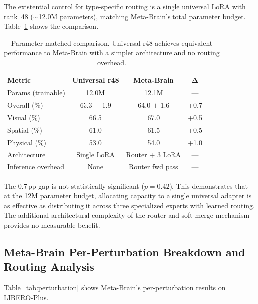 \documentclass[letterpaper]{article}
\newcommand{\ours}{Meta-Brain}
\newcommand{\pp}{\,\text{pp}}
\begin{document}
The existential control for type-specific routing is a single universal LoRA with rank~48 ($\sim$12.0M parameters), matching \ours{}'s total parameter budget. Table~\ref{tab:r48} shows the comparison.

\begin{table}[h]
\centering
\caption{Parameter-matched comparison. Universal r48 achieves equivalent performance to \ours{} with a simpler architecture and no routing overhead.}
\label{tab:r48}
\small
\begin{tabular}{lccccl}
\toprule
\textbf{Metric} & \textbf{Universal r48} & \textbf{\ours{}} & $\boldsymbol{\Delta}$ \\
\midrule
Params (trainable) & 12.0M & 12.1M & --- \\
Overall (\%) & 63.3 $\pm$ 1.9 & 64.0 $\pm$ 1.6 & +0.7 \\
Visual (\%) & 66.5 & 67.0 & +0.5 \\
Spatial (\%) & 61.0 & 61.5 & +0.5 \\
Physical (\%) & 53.0 & 54.0 & +1.0 \\
Architecture & Single LoRA & Router + 3 LoRA & --- \\
Inference overhead & None & Router fwd pass & --- \\
\bottomrule
\end{tabular}
\end{table}

The 0.7$\pp$ gap is not statistically significant ($p = 0.42$). This demonstrates that at the 12M parameter budget, allocating capacity to a single universal adapter is as effective as distributing it across three specialized experts with learned routing. The additional architectural complexity of the router and soft-merge mechanism provides no measurable benefit.

\subsection{\ours{} Per-Perturbation Breakdown and Routing Analysis}
\label{sec:meta_brain_detail}

Table~\ref{tab:perturbation} shows \ours{}'s per-perturbation results on LIBERO-Plus.
\end{document}

